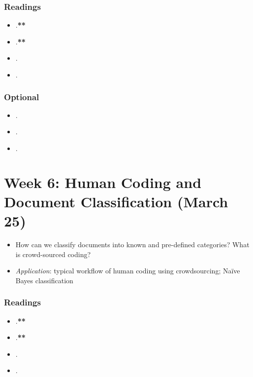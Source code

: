 \documentclass[abstract=on,parskip=full,headings=standardclasses,fontsize=11pt,paper=a4]{scrartcl}
\begin{document}
\subsubsection*{Readings}
\begin{itemize}
\item {}.\textbf{**}
\item {}.\textbf{**}
\item {}.
\item {}.
\end{itemize}

\subsubsection*{Optional}
\begin{itemize}
\item {}.
\item {}.
\item {}.
\end{itemize}


\section{Week 6: Human Coding and Document Classification (March 25)}

\begin{itemize}
\renewcommand\labelitemi{--}
\item How can we classify documents into known and pre-defined categories? What is crowd-sourced coding?
\item \textit{Application}: typical workflow of human coding using crowdsourcing; Naïve Bayes classification
\end{itemize}

\subsubsection*{Readings}
\begin{itemize}
\item {}.\textbf{**}
\item {}.\textbf{**}
\item {}.
\item {}.
\end{itemize}
\end{document}
